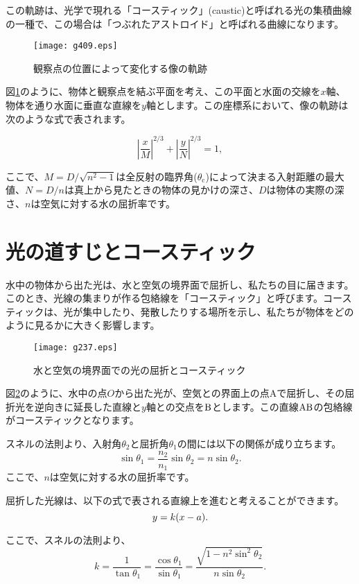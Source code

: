 \documentclass[twocolumn]{article}
\begin{document}
	この軌跡は、光学で現れる「コースティック」(caustic)と呼ばれる光の集積曲線の一種で、この場合は「つぶれたアストロイド」と呼ばれる曲線になります。
	
	\begin{figure}[h]
		\centering
		\texttt{[image: g409.eps]} \hfill\null
		\caption{観察点の位置によって変化する像の軌跡}
		\label{fig:caustic}
	\end{figure}
	
	図\ref{fig:caustic}のように、物体と観察点を結ぶ平面を考え、この平面と水面の交線を$x$軸、物体を通り水面に垂直な直線を$y$軸とします。この座標系において、像の軌跡は次のような式で表されます。
	
	$$ \left| \dfrac{x}{M} \right| ^ {2/3} 
	+ \left| \dfrac{y}{N} \right| ^ {2/3} = 1,$$
	
	ここで、$M = D/\sqrt{n^2 - 1}$は全反射の臨界角($\theta_{\mathrm{c}}$)によって決まる入射距離の最大値、$N = D/n$は真上から見たときの物体の見かけの深さ、$D$は物体の実際の深さ、$n$は空気に対する水の屈折率です。
	
	\section{光の道すじとコースティック}
	
	水中の物体から出た光は、水と空気の境界面で屈折し、私たちの目に届きます。このとき、光線の集まりが作る包絡線を「コースティック」と呼びます。コースティックは、光が集中したり、発散したりする場所を示し、私たちが物体をどのように見るかに大きく影響します。
	
	\begin{figure}[ht]
		\centering
		\texttt{[image: g237.eps]}
		\caption{水と空気の境界面での光の屈折とコースティック}
		\label{fig:geometry}
	\end{figure}
	
	図\ref{fig:geometry}のように、水中の点$O$から出た光が、空気との界面上の点Aで屈折し、その屈折光を逆向きに延長した直線と$y$軸との交点を${\mathrm{{B}}}$とします。この直線${\mathrm{{A}{B}}}$の包絡線がコースティックとなります。
	
	スネルの法則より、入射角$\theta_2$と屈折角$\theta_1$の間には以下の関係が成り立ちます。
	$$ \sin\theta_1 = \frac{n_2}{n_1} \sin\theta_2 = n\sin\theta_2.$$
	ここで、$n$は空気に対する水の屈折率です。
	
	屈折した光線は、以下の式で表される直線上を進むと考えることができます。
	$$y=k(x-{a}).$$
	
	ここで、スネルの法則より、
	$$k=\dfrac{1}{\tan\theta_1}=\dfrac{\cos\theta_1}{\sin\theta_1}
	=\dfrac{\sqrt{1-n^2\sin^2\theta_2}}{n\sin\theta_2}.$$
	
\end{document}
